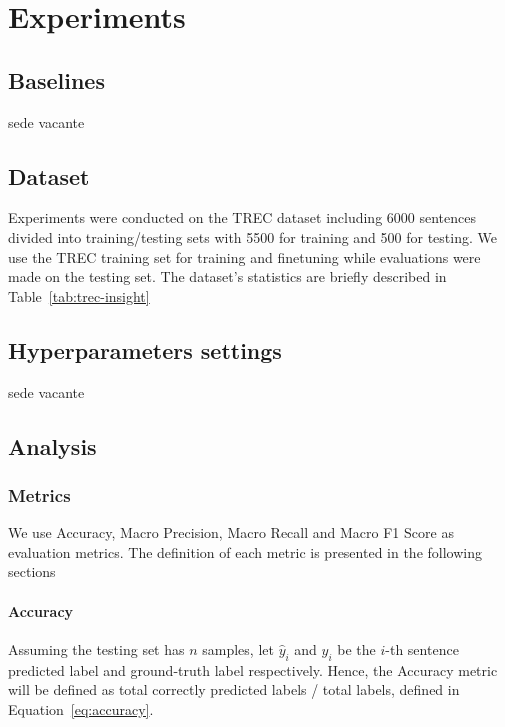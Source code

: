 \documentclass[pdflatex,sn-mathphys]{sn-jnl}%
\theoremstyle{thmstyleone}%
\theoremstyle{thmstyletwo}%
\theoremstyle{thmstylethree}%
\begin{document}
\section{Experiments}\label{experiments}
\subsection{Baselines}
sede vacante

\subsection{Dataset}
Experiments were conducted on the TREC dataset\cite{hovy2001, li2002} including 6000 sentences divided into training/testing sets with 5500 for training and 500 for testing. We use the TREC training set for training and finetuning while evaluations were made on the testing set. The dataset’s statistics are briefly described in Table~\ref{tab:trec-insight}

\begin{table}[htp]
\centering
\caption{Insight of the TREC dataset} \label{tab:trec-insight}
\end{table}

\subsection{Hyperparameters settings}
sede vacante

\subsection{Analysis}
\subsubsection{Metrics}
We use Accuracy, Macro Precision, Macro Recall and Macro F1 Score as evaluation metrics. The definition of each metric is presented in the following sections

\paragraph{Accuracy}
Assuming the testing set has $n$ samples, let $\hat{y}_i$ and $y_i$ be the $i$-th sentence predicted label and ground-truth label respectively. Hence, the Accuracy metric will be defined as total correctly predicted labels / total labels, defined in Equation~\ref{eq:accuracy}.
\end{document}
